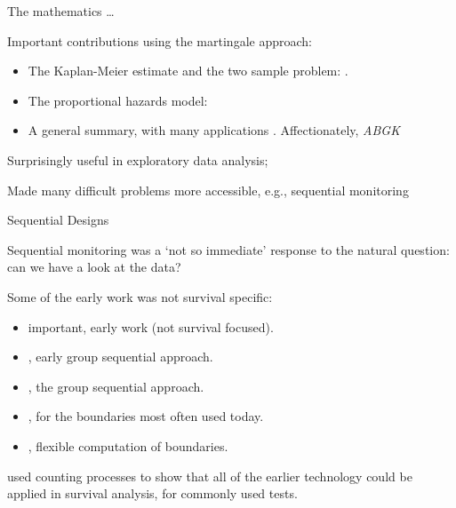 \documentclass[11pt]{beamer}
\begin{document}
\begin{frame}{The mathematics \ldots}
    
Important contributions using the martingale approach:

\begin{itemize}
    \item The Kaplan-Meier estimate and the two sample problem: \cite{gill1980censoring}.
    
    \item The proportional hazards model: \cite{andersen1982cox}
    
    \item A general summary, with many applications \cite{andersen1993statistical}.  Affectionately, \textit{ABGK}
\end{itemize}    
    
Surprisingly useful in exploratory data analysis;  \cite{therneau2000modeling}

Made many difficult problems more accessible, e.g., sequential monitoring

    
\end{frame}

\begin{frame}{Sequential Designs}

Sequential monitoring was a `not so immediate' response to the natural question: can we have a look at the data?

Some of the early work was not survival specific:

\begin{itemize}
    
  \item \cite{armitage1960sequential} important, early work (not survival focused).
  
  \item \cite{haybittle1971repeated}, early group sequential approach.
  
  \item \cite{pocock1977group}, the group sequential approach.
  
  \item \cite{o1979multiple}, for the boundaries most often used today.
  
  \item \cite{lan1983discrete}, flexible computation of boundaries.
  
  \end{itemize}
  
 \pause

\cite{tsiatis1981asymptotic} used counting processes to show that all of the earlier technology could be applied in survival analysis, for commonly used tests.
    
\end{frame}
\end{document}
